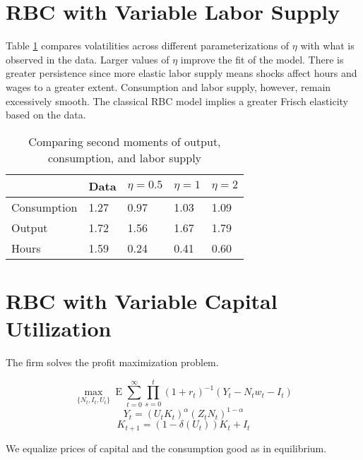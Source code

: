 \documentclass[11pt]{article}
\DeclareMathOperator{\ev}{E}
\begin{document}
\section{RBC with Variable Labor Supply}

    Table \ref{tab:varlabor} compares volatilities across different parameterizations of $\eta$ with what is observed in the data. Larger values of $\eta$ improve the fit of the model. There is greater persistence since more elastic labor supply means shocks affect hours and wages to a greater extent. Consumption and labor supply, however, remain excessively smooth. The classical RBC model implies a greater Frisch elasticity based on the data.

    \begin{table}[h]
    \caption{Comparing second moments of output, consumption, and labor supply}
    \label{tab:varlabor}
    \centering
    \begin{tabular}{p{2cm}p{2cm}p{2cm}p{2cm}p{2cm}}
    \hline
     & Data & $\eta = 0.5$ & $\eta = 1$ & $\eta = 2$ \tabularnewline
    \hline
    Consumption & 1.27 & 0.97 & 1.03 & 1.09 \tabularnewline
    Output & 1.72 & 1.56 & 1.67 & 1.79 \tabularnewline
    Hours & 1.59 & 0.24 & 0.41 & 0.60 \tabularnewline
    \hline
    \end{tabular}
    \end{table}

\section{RBC with Variable Capital Utilization}

    The firm solves the profit maximization problem.

        $$ \max_{\{N_t, I_t, U_t\}} \ev \sum_{t=0}^\infty \prod_{s=0}^t (1+r_t)^{-1} (Y_t - N_t w_t - I_t) $$
        $$ Y_t = (U_t K_t)^\alpha (Z_t N_t)^{1-\alpha} $$
        $$ K_{t+1} = (1-\delta(U_t))K_t + I_t $$

    We equalize prices of capital and the consumption good as in equilibrium.
\end{document}
